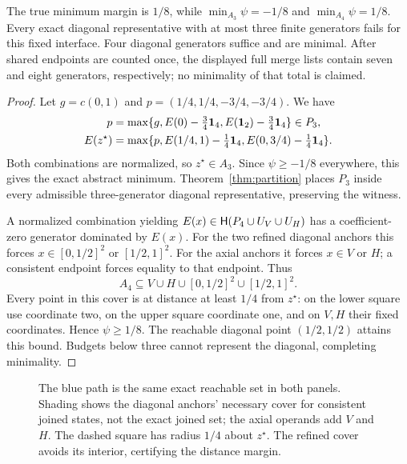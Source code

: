 \begin{proposition}\label{prop:nonlinear-recovery}
The true minimum margin is $1/8$, while $\min_{A_3}\psi=-1/8$ and $\min_{A_4}\psi=1/8$. Every exact diagonal representative with at most three finite generators fails for this fixed interface. Four diagonal generators suffice and are minimal. After shared endpoints are counted once, the displayed full merge lists contain seven and eight generators, respectively; no minimality of that total is claimed.
\end{proposition}
\begin{proof}
Let $g=c(0,1)$ and $p=(1/4,1/4,-3/4,-3/4)$. We have
\begin{align*}
p&=\max\{g,E(0)-\tfrac34\mathbf 1_4,E(\mathbf 1_2)-\tfrac34\mathbf 1_4\}\in P_3,\\
E(z^\star)&=\max\{p,E(1/4,1)-\tfrac14\mathbf 1_4,E(0,3/4)-\tfrac14\mathbf 1_4\}.
\end{align*}
Both combinations are normalized, so $z^\star\in A_3$. Since $\psi\ge-1/8$ everywhere, this gives the exact abstract minimum. Theorem~\ref{thm:partition} places $P_3$ inside every admissible three-generator diagonal representative, preserving the witness.

A normalized combination yielding $E(x)\in\mathsf H(P_4\cup U_V\cup U_H)$ has a coefficient-zero generator dominated by $E(x)$. For the two refined diagonal anchors this forces $x\in[0,1/2]^2$ or $[1/2,1]^2$. For the axial anchors it forces $x\in V$ or $H$; a consistent endpoint forces equality to that endpoint. Thus
\[
A_4\subseteq V\cup H\cup[0,1/2]^2\cup[1/2,1]^2.
\]
Every point in this cover is at distance at least $1/4$ from $z^\star$: on the lower square use coordinate two, on the upper square coordinate one, and on $V,H$ their fixed coordinates. Hence $\psi\ge1/8$. The reachable diagonal point $(1/2,1/2)$ attains this bound. Budgets below three cannot represent the diagonal, completing minimality.
\end{proof}

\begin{figure}[t]
\centering

\caption{The blue path is the same exact reachable set in both panels. Shading shows the diagonal anchors' necessary cover for consistent joined states, not the exact joined set; the axial operands add $V$ and $H$. The dashed square has radius $1/4$ about $z^\star$. The refined cover avoids its interior, certifying the distance margin.}\label{fig:recovery}
\end{figure}

